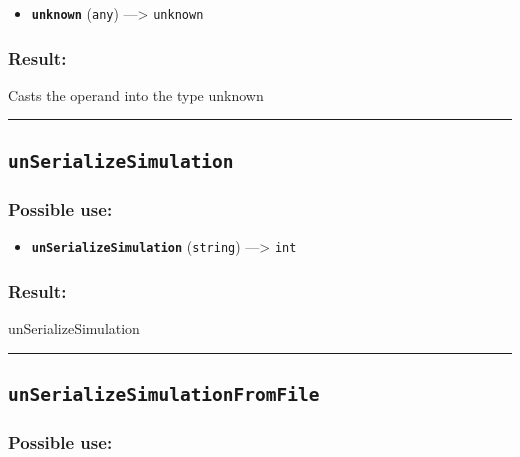 \documentclass[]{book}
\providecommand{\tightlist}{%
  \setlength{\itemsep}{0pt}\setlength{\parskip}{0pt}}
\theoremstyle{definition}
\theoremstyle{definition}
\theoremstyle{definition}
\theoremstyle{remark}
\begin{document}
\begin{itemize}
\tightlist
\item
  \textbf{\texttt{unknown}} (\texttt{any}) ---\textgreater{}
  \texttt{unknown}
\end{itemize}

\subsubsection{Result:}\label{result-520}

Casts the operand into the type unknown

\begin{center}\rule{0.5\linewidth}{\linethickness}\end{center}

\subsection{\texorpdfstring{\texttt{unSerializeSimulation}}{unSerializeSimulation}}\label{unserializesimulation}

\subsubsection{Possible use:}\label{possible-use-540}

\begin{itemize}
\tightlist
\item
  \textbf{\texttt{unSerializeSimulation}} (\texttt{string})
  ---\textgreater{} \texttt{int}
\end{itemize}

\subsubsection{Result:}\label{result-521}

unSerializeSimulation

\begin{center}\rule{0.5\linewidth}{\linethickness}\end{center}

\subsection{\texorpdfstring{\texttt{unSerializeSimulationFromFile}}{unSerializeSimulationFromFile}}\label{unserializesimulationfromfile}

\subsubsection{Possible use:}\label{possible-use-541}
\end{document}
